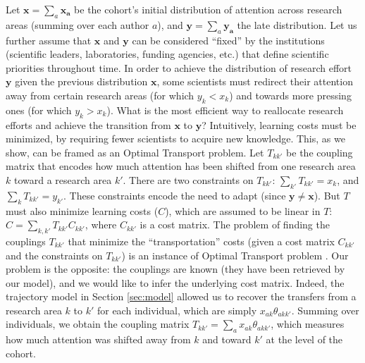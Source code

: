\documentclass{article}
\begin{document}
Let $\bm{x}=\sum_a \bm{x_a}$ be the cohort's initial distribution of attention across research areas (summing over each author $a$), and $\bm{y}=\sum_a \bm{y_a}$ the late distribution. Let us further assume that $\bm{x}$ and $\bm{y}$ can be considered ``fixed'' by the institutions (scientific leaders, laboratories, funding agencies, etc.) that define scientific priorities throughout time. In order to achieve the distribution of research effort $\bm{y}$ given the previous distribution $\bm{x}$, some scientists must redirect their attention away from certain research areas (for which $y_k<x_k$) and towards more pressing ones (for which $y_k>x_k$). What is the most efficient way to reallocate research efforts and achieve the transition from $\bm{x}$ to $\bm{y}$? Intuitively, learning costs must be minimized, by requiring fewer scientists to acquire new knowledge. This, as we show, can be framed as an Optimal Transport problem. Let $T_{kk'}$ be the coupling matrix that encodes how much attention has been shifted from one research area $k$ toward a research area $k'$. There are two constraints on $T_{kk'}$: $\sum_{k'} T_{kk'} = x_k$, and $\sum_{k} T_{kk'} = y_{k'}$. These constraints encode the need to adapt (since $\bm{y}\neq \bm{x}$). But $T$ must also minimize learning costs ($C$), which are assumed to be linear in $T$: $C=\sum_{k,k'}T_{kk'}C_{kk'}$, where $C_{kk'}$ is a cost matrix. The problem of finding the couplings $T_{kk'}$ that minimize the ``transportation'' costs (given a cost matrix $C_{kk'}$ and the constraints on $T_{kk'}$) is an instance of Optimal Transport problem \citep{Peyre2018}. Our problem is the opposite: the couplings are known (they have been retrieved by our model), and we would like to infer the underlying cost matrix. Indeed, the trajectory model in Section \ref{sec:model} allowed us to recover the transfers from a research area $k$ to $k'$ for each individual, which are simply $x_{ak}\theta_{akk'}$. Summing over individuals, we obtain the coupling matrix $T_{kk'}=\sum_a x_{ak} \theta_{akk'}$, which measures how much attention was shifted away from $k$ and toward $k'$ at the level of the cohort.
\end{document}
